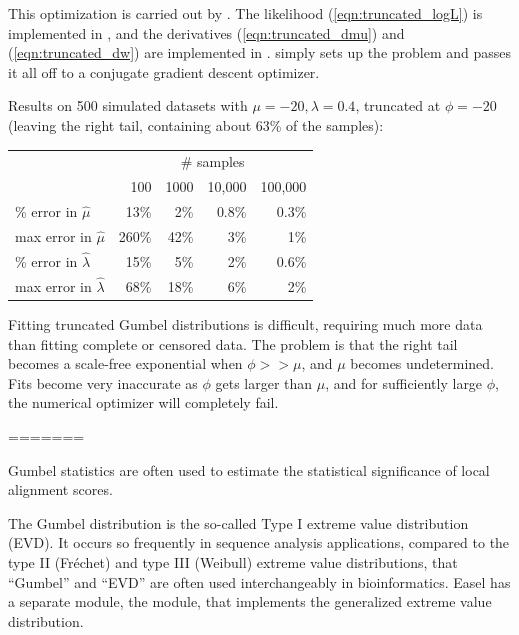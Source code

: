 This optimization is carried out by .
The likelihood (\ref{eqn:truncated_logL}) is implemented in
, and the derivatives (\ref{eqn:truncated_dmu}) and
(\ref{eqn:truncated_dw}) are implemented in .
 simply sets up the problem and passes
it all off to a conjugate gradient descent optimizer.

Results on 500 simulated datasets with $\mu = -20, \lambda = 0.4$,
truncated at $\phi = -20$ (leaving the right tail, containing about
63\% of the samples):

\begin{center}
\begin{tabular}{lrrrr} \hline
                              & \multicolumn{4}{c}{\# samples}\\
                              & 100 & 1000  & 10,000 & 100,000 \\
\% error in $\hat{\mu}$       & 13\%&   2\% &  0.8\% &  0.3\%  \\
max error in $\hat{\mu}$      &260\%&  42\% &    3\% &    1\%  \\
\% error in $\hat{\lambda}$   & 15\%&   5\% &    2\% &  0.6\%  \\
max error in $\hat{\lambda}$  & 68\%&  18\% &    6\% &    2\%  \\ \hline
\end{tabular}
\end{center}

Fitting truncated Gumbel distributions is difficult, requiring much
more data than fitting complete or censored data. The problem is that
the right tail becomes a scale-free exponential when $\phi >> \mu$,
and $\mu$ becomes undetermined. Fits become very inaccurate as $\phi$
gets larger than $\mu$, and for sufficiently large $\phi$, the
numerical optimizer will completely fail.







=======

Gumbel statistics are often used to estimate the statistical
significance of local alignment scores.

The Gumbel distribution is the so-called Type I extreme value
distribution (EVD). It occurs so frequently in sequence analysis
applications, compared to the type II (Fr\'{e}chet) and type III
(Weibull) extreme value distributions, that ``Gumbel'' and ``EVD'' are
often used interchangeably in bioinformatics. Easel has a separate
module, the  module, that implements the generalized
extreme value distribution.

